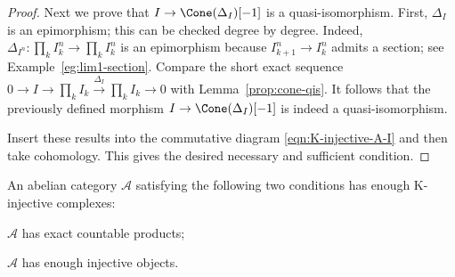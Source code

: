 \begin{proof}
	Next we prove that $I\to\Cone(\Delta_I)[-1]$ is a quasi-isomorphism.
	First, $\Delta_I$ is an epimorphism; this can be checked degree by degree.
	Indeed,
	$\Delta_{I^n}:\prod_k I_k^n\to\prod_k I_k^n$ is an epimorphism because
	$I_{k+1}^n\to I_k^n$ admits a section; see
	Example~\ref{eg:lim1-section}. Compare the short exact sequence
	$0\to I\to\prod_k I_k\xrightarrow{\Delta_I}\prod_k I_k\to0$ with
	Lemma~\ref{prop:cone-qis}. It follows that the previously defined
	morphism $I\to\Cone(\Delta_I)[-1]$ is indeed a quasi-isomorphism.

	Insert these results into the commutative diagram
	\eqref{eqn:K-injective-A-I} and then take cohomology. This gives the
	desired necessary and sufficient condition.
\end{proof}

\begin{theorem}\label{prop:K-injective-resolution}
	An abelian category $\mathcal{A}$ satisfying the following two
	conditions has enough K-injective complexes:
	\begin{compactitem}
		\item $\mathcal{A}$ has exact countable products;
		\item $\mathcal{A}$ has enough injective objects.
	\end{compactitem}
\end{theorem}

